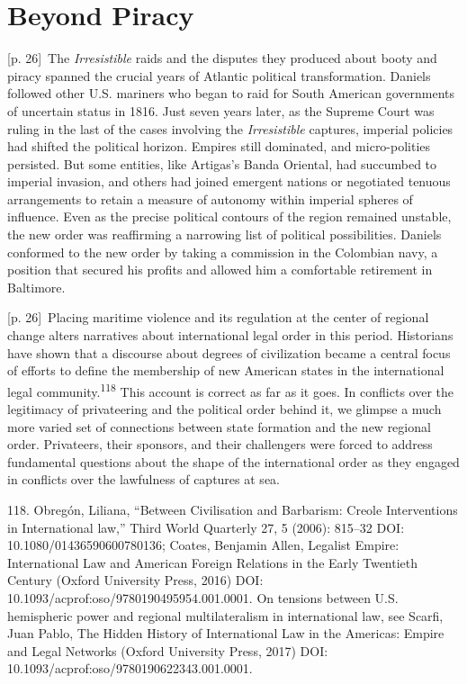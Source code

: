 \documentclass[10pt,a4paper]{article}
\begin{document}
\section*{Beyond Piracy}
{\scriptsize\color{gray} [p. 26]}\ The \textit{Irresistible} raids and the disputes they produced about booty and piracy spanned the crucial years of Atlantic political transformation. Daniels followed other U.S. mariners who began to raid for South American governments of uncertain status in 1816. Just seven years later, as the Supreme Court was ruling in the last of the cases involving the \textit{Irresistible} captures, imperial policies had shifted the political horizon. Empires still dominated, and micro-polities persisted. But some entities, like Artigas’s Banda Oriental, had succumbed to imperial invasion, and others had joined emergent nations or negotiated tenuous arrangements to retain a measure of autonomy within imperial spheres of influence. Even as the precise political contours of the region remained unstable, the new order was reaffirming a narrowing list of political possibilities. Daniels conformed to the new order by taking a commission in the Colombian navy, a position that secured his profits and allowed him a comfortable retirement in Baltimore.\par
{\scriptsize\color{gray} [p. 26]}\ Placing maritime violence and its regulation at the center of regional change alters narratives about international legal order in this period. Historians have shown that a discourse about degrees of civilization became a central focus of efforts to define the membership of new American states in the international legal community.\nobreak\textsuperscript{118} This account is correct as far as it goes. In conflicts over the legitimacy of privateering and the political order behind it, we glimpse a much more varied set of connections between state formation and the new regional order. Privateers, their sponsors, and their challengers were forced to address fundamental questions about the shape of the international order as they engaged in conflicts over the lawfulness of captures at sea.\par{\small 118. Obregón, Liliana, “Between Civilisation and Barbarism: Creole Interventions in International law,” Third World Quarterly 27, 5 (2006): 815–32 DOI: 10.1080/01436590600780136; Coates, Benjamin Allen, Legalist Empire: International Law and American Foreign Relations in the Early Twentieth Century (Oxford University Press, 2016) DOI: 10.1093/acprof:oso/9780190495954.001.0001. On tensions between U.S. hemispheric power and regional multilateralism in international law, see Scarfi, Juan Pablo, The Hidden History of International Law in the Americas: Empire and Legal Networks (Oxford University Press, 2017) DOI: 10.1093/acprof:oso/9780190622343.001.0001.\par}
\end{document}
